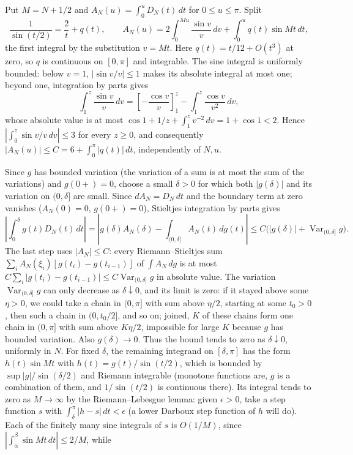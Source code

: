 Put $M=N+1/2$ and $A_N(u)=\int_0^uD_N(t)\,dt$ for $0\le u\le\pi$.
Split
\[
\frac1{\sin(t/2)}=\frac2t+q(t),\qquad
A_N(u)=2\int_0^{Mu}\frac{\sin v}{v}\,dv
+\int_0^u q(t)\sin Mt\,dt,
\]
the first integral by the substitution $v=Mt$.
Here $q(t)=t/12+O(t^3)$ at zero, so $q$ is continuous on $[0,\pi]$ and
integrable. The sine integral is uniformly bounded: below $v=1$,
$|\sin v/v|\le1$ makes its absolute integral at most one; beyond one,
integration by parts gives
\[
\int_1^z\frac{\sin v}{v}\,dv
=\left[-\frac{\cos v}{v}\right]_1^z
-\int_1^z\frac{\cos v}{v^2}\,dv,
\]
whose absolute value is at most
$\cos1+1/z+\int_1^zv^{-2}\,dv=1+\cos1<2$. Hence
$|\int_0^z\sin v/v\,dv|\le3$ for every $z\ge0$, and consequently
$|A_N(u)|\le C=6+\int_0^\pi|q(t)|\,dt$, independently of $N,u$.

Since $g$ has bounded variation (the variation of a sum is at most the
sum of the variations) and $g(0+)=0$, choose a small
$\delta>0$ for which both $|g(\delta)|$ and its variation on
$(0,\delta]$ are small. Since $dA_N=D_N\,dt$ and the boundary term at
zero vanishes ($A_N(0)=0$, $g(0+)=0$), Stieltjes integration by parts
gives
\[
\left|\int_0^\delta g(t)D_N(t)\,dt\right|
=\left|g(\delta)A_N(\delta)-\int_{(0,\delta]}A_N(t)\,dg(t)\right|
\le C\bigl(|g(\delta)|+\operatorname{Var}_{(0,\delta]}g\bigr).
\]
The last step uses $|A_N|\le C$: every Riemann--Stieltjes sum
$\sum_iA_N(\xi_i)[g(t_i)-g(t_{i-1})]$ of $\int A_N\,dg$ is at most
$C\sum_i|g(t_i)-g(t_{i-1})|\le C\operatorname{Var}_{(0,\delta]}g$ in
absolute value.
The variation $\operatorname{Var}_{(0,\delta]}g$ can only decrease as
$\delta\downarrow0$, and its limit is zero: if it stayed above some
$\eta>0$, we could take a chain in $(0,\pi]$ with sum above $\eta/2$,
starting at some $t_0>0$, then such a chain in $(0,t_0/2]$, and so on;
joined, $K$ of these chains form one chain in $(0,\pi]$ with sum above
$K\eta/2$, impossible for large $K$ because $g$ has bounded variation.
Also $g(\delta)\to0$. Thus the bound tends to zero as
$\delta\downarrow0$, uniformly in $N$.
For fixed $\delta$, the remaining integrand on $[\delta,\pi]$ has the
form $h(t)\sin Mt$ with $h(t)=g(t)/\sin(t/2)$, which is bounded by
$\sup|g|/\sin(\delta/2)$ and Riemann integrable (monotone functions are,
$g$ is a combination of them, and $1/\sin(t/2)$ is continuous there). Its integral
tends to zero as $M\to\infty$ by the Riemann--Lebesgue lemma: given
$\epsilon>0$, take a step function $s$ with
$\int_\delta^\pi|h-s|\,dt<\epsilon$ (a lower Darboux step function of
$h$ will do). Each of the finitely many sine integrals of $s$ is
$O(1/M)$, since $|\int_\alpha^\beta\sin Mt\,dt|\le2/M$, while
